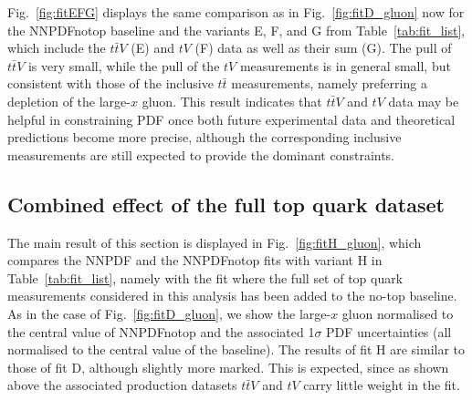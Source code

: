 \documentclass[withindex,glossary]{cam-thesis}
\begin{document}
Fig.~\ref{fig:fitEFG} displays the same comparison as in
Fig.~\ref{fig:fitD_gluon} now for the NNPDFnotop baseline
and the variants E, F, and G from Table~\ref{tab:fit_list}, which 
include the $t\bar{t}V$ (E) and $tV$ (F) data
as well as their sum (G).
%
The pull of $t\bar{t}V$ is very small, while the pull of the $tV$
measurements is in general small, but consistent
with those of the inclusive  $t\bar{t}$ measurements, namely preferring a
depletion of the large-$x$ gluon.
%
This result indicates that $t\bar{t}V$  and $tV$  data may be
helpful in constraining PDF once both future experimental data 
and theoretical predictions become more precise, although
the corresponding inclusive measurements are still expected to provide
the dominant constraints. 

\subsection{Combined effect of the full top quark dataset}
\label{sec:alltop}

The main result of this section is displayed in Fig.~\ref{fig:fitH_gluon},
which compares the NNPDF and the NNPDFnotop fits with variant H in
Table~\ref{tab:fit_list},
namely with the fit where the full set of top quark measurements considered
in this analysis has been added to the no-top baseline.
%
As in the case of Fig.~\ref{fig:fitD_gluon}, we show the large-$x$ gluon
normalised to the central value of NNPDFnotop and the associated
1$\sigma$ PDF uncertainties (all normalised to the central value of the
baseline).
%
The results of fit H are similar to those of fit D, although slightly
more marked. This is expected, 
since as shown above the associated production datasets $t\bar{t}V$
and $tV$ carry little weight in the fit.
\end{document}
